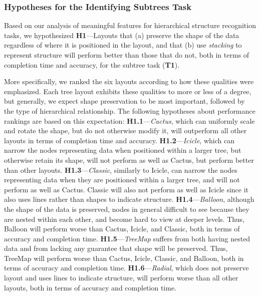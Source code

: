 \documentclass[a4paper]{llncs}
\begin{document}
\subsubsection{Hypotheses for the Identifying Subtrees Task} Based on our analysis of meaningful features for hierarchical structure recognition tasks, we hypothesized \textbf{H1}---Layouts that (a) preserve the shape of the data regardless of where it is positioned in the layout, and that (b) use \textit{stacking} to represent structure will perform better than those that do not, both in terms of completion time and accuracy, for the subtree task (\textbf{T1}). 

More specifically, we ranked the six layouts according to how these qualities were emphasized. Each tree layout exhibits these qualities to more or less of a degree, but generally, we expect shape preservation to be most important, followed by the type of hierarchical relationship. The following hypotheses about performance rankings are based on this expectation: \textbf{H1.1}---\textit{Cactus}, which can uniformly scale and rotate the shape, but do not otherwise modify it, will outperform all other layouts in terms of completion time and accuracy.
\noindent\textbf{H1.2}---\textit{Icicle}, which can narrow the nodes representing data when positioned within a larger tree, but otherwise retain its shape, will not perform as well as Cactus, but perform better than other layouts.
\noindent\textbf{H1.3}---\textit{Classic}, similarly to Icicle, can narrow the nodes representing data when they are positioned within a larger tree, and will not perform as well as Cactus. Classic will also not perform as well as Icicle since it also uses lines rather than shapes to indicate structure.
\noindent\textbf{H1.4}---\textit{Balloon}, although the shape of the data is preserved, nodes in general difficult to see because they are nested within each other, and become hard to view at deeper levels. Thus, Balloon will perform worse than Cactus, Icicle, and Classic, both in terms of accuracy and completion time.
\noindent\textbf{H1.5}---\textit{TreeMap} suffers from both having nested data and from lacking any guarantee that shape will be preserved. Thus, TreeMap will perform worse than Cactus, Icicle, Classic, and Balloon, both in terms of accuracy and completion time.
\noindent\textbf{H1.6}---\textit{Radial}, which does not preserve layout and uses lines to indicate structure, will perform worse than all other layouts, both in terms of accuracy and completion time.
 
 
 
\end{document}
